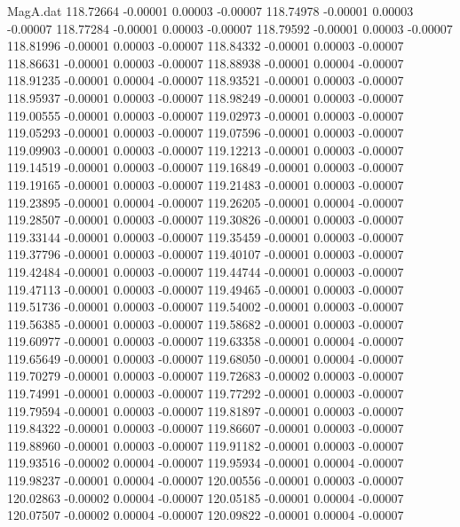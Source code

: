 \begin{filecontents}{MagA.dat}
 118.72664   -0.00001    0.00003   -0.00007
 118.74978   -0.00001    0.00003   -0.00007
 118.77284   -0.00001    0.00003   -0.00007
 118.79592   -0.00001    0.00003   -0.00007
 118.81996   -0.00001    0.00003   -0.00007
 118.84332   -0.00001    0.00003   -0.00007
 118.86631   -0.00001    0.00003   -0.00007
 118.88938   -0.00001    0.00004   -0.00007
 118.91235   -0.00001    0.00004   -0.00007
 118.93521   -0.00001    0.00003   -0.00007
 118.95937   -0.00001    0.00003   -0.00007
 118.98249   -0.00001    0.00003   -0.00007
 119.00555   -0.00001    0.00003   -0.00007
 119.02973   -0.00001    0.00003   -0.00007
 119.05293   -0.00001    0.00003   -0.00007
 119.07596   -0.00001    0.00003   -0.00007
 119.09903   -0.00001    0.00003   -0.00007
 119.12213   -0.00001    0.00003   -0.00007
 119.14519   -0.00001    0.00003   -0.00007
 119.16849   -0.00001    0.00003   -0.00007
 119.19165   -0.00001    0.00003   -0.00007
 119.21483   -0.00001    0.00003   -0.00007
 119.23895   -0.00001    0.00004   -0.00007
 119.26205   -0.00001    0.00004   -0.00007
 119.28507   -0.00001    0.00003   -0.00007
 119.30826   -0.00001    0.00003   -0.00007
 119.33144   -0.00001    0.00003   -0.00007
 119.35459   -0.00001    0.00003   -0.00007
 119.37796   -0.00001    0.00003   -0.00007
 119.40107   -0.00001    0.00003   -0.00007
 119.42484   -0.00001    0.00003   -0.00007
 119.44744   -0.00001    0.00003   -0.00007
 119.47113   -0.00001    0.00003   -0.00007
 119.49465   -0.00001    0.00003   -0.00007
 119.51736   -0.00001    0.00003   -0.00007
 119.54002   -0.00001    0.00003   -0.00007
 119.56385   -0.00001    0.00003   -0.00007
 119.58682   -0.00001    0.00003   -0.00007
 119.60977   -0.00001    0.00003   -0.00007
 119.63358   -0.00001    0.00004   -0.00007
 119.65649   -0.00001    0.00003   -0.00007
 119.68050   -0.00001    0.00004   -0.00007
 119.70279   -0.00001    0.00003   -0.00007
 119.72683   -0.00002    0.00003   -0.00007
 119.74991   -0.00001    0.00003   -0.00007
 119.77292   -0.00001    0.00003   -0.00007
 119.79594   -0.00001    0.00003   -0.00007
 119.81897   -0.00001    0.00003   -0.00007
 119.84322   -0.00001    0.00003   -0.00007
 119.86607   -0.00001    0.00003   -0.00007
 119.88960   -0.00001    0.00003   -0.00007
 119.91182   -0.00001    0.00003   -0.00007
 119.93516   -0.00002    0.00004   -0.00007
 119.95934   -0.00001    0.00004   -0.00007
 119.98237   -0.00001    0.00004   -0.00007
 120.00556   -0.00001    0.00003   -0.00007
 120.02863   -0.00002    0.00004   -0.00007
 120.05185   -0.00001    0.00004   -0.00007
 120.07507   -0.00002    0.00004   -0.00007
 120.09822   -0.00001    0.00004   -0.00007

\end{filecontents}
